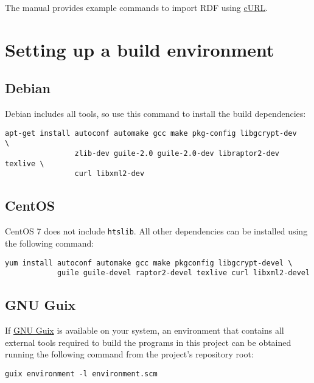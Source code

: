  The manual provides example commands to import RDF using
  \href{https://curl.haxx.se/}{cURL}.

\section{Setting up a build environment}

\subsection{Debian}

  Debian includes all tools, so use this command to install the
  build dependencies:

\begin{siderules}
\begin{verbatim}
apt-get install autoconf automake gcc make pkg-config libgcrypt-dev     \
                zlib-dev guile-2.0 guile-2.0-dev libraptor2-dev texlive \
                curl libxml2-dev
\end{verbatim}
\end{siderules}

\subsection{CentOS}

  CentOS 7 does not include \texttt{htslib}.  All other dependencies can
  be installed using the following command:

\begin{siderules}
\begin{verbatim}
yum install autoconf automake gcc make pkgconfig libgcrypt-devel \
            guile guile-devel raptor2-devel texlive curl libxml2-devel
\end{verbatim}
\end{siderules}

\subsection{GNU Guix}

  If \href{https://www.gnu.org/software/guix}{GNU Guix} is available on your
  system, an environment that contains all external tools required to build
  the programs in this project can be obtained running the following command
  from the project's repository root:

\begin{siderules}
\begin{verbatim}
guix environment -l environment.scm
\end{verbatim}
\end{siderules}

